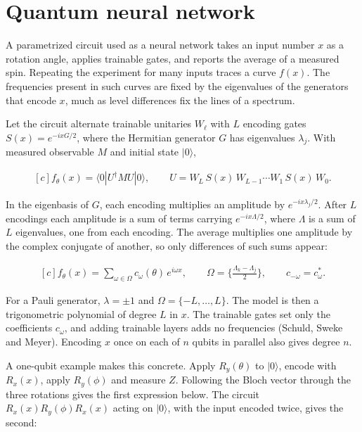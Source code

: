 \documentclass[11pt,oneside]{book}
\newenvironment{centeredalign}{\[\begin{gathered}[c]}{\end{gathered}\]}
\begin{document}
\clearpage

\section{Quantum neural network}

\label{topic:quantum-neural-network}

A parametrized circuit used as a neural network takes an input number \(x\) as a rotation angle, applies trainable gates, and reports the average of a measured spin. Repeating the experiment for many inputs traces a curve \(f(x)\). The frequencies present in such curves are fixed by the eigenvalues of the generators that encode \(x\), much as level differences fix the lines of a spectrum.

Let the circuit alternate trainable unitaries \(W_\ell\) with \(L\) encoding gates \(S(x)=e^{-ixG/2}\), where the Hermitian generator \(G\) has eigenvalues \(\lambda_j\). With measured observable \(M\) and initial state \(|0\rangle\),

\begin{centeredalign}
f_\theta(x)=\langle0|U^\dagger MU|0\rangle,\qquad
U=W_L\,S(x)\,W_{L-1}\cdots W_1\,S(x)\,W_0.
\end{centeredalign}

In the eigenbasis of \(G\), each encoding multiplies an amplitude by \(e^{-ix\lambda_j/2}\). After \(L\) encodings each amplitude is a sum of terms carrying \(e^{-ix\Lambda/2}\), where \(\Lambda\) is a sum of \(L\) eigenvalues, one from each encoding. The average multiplies one amplitude by the complex conjugate of another, so only differences of such sums appear:

\begin{centeredalign}
f_\theta(x)=\sum_{\omega\in\Omega}c_\omega(\theta)\,e^{i\omega x},\qquad
\Omega=\Big\{\frac{\Lambda_k-\Lambda_j}{2}\Big\},\qquad c_{-\omega}=c_\omega^*.
\end{centeredalign}

For a Pauli generator, \(\lambda=\pm1\) and \(\Omega=\{-L,\ldots,L\}\). The model is then a trigonometric polynomial of degree \(L\) in \(x\). The trainable gates set only the coefficients \(c_\omega\), and adding trainable layers adds no frequencies (Schuld, Sweke and Meyer). Encoding \(x\) once on each of \(n\) qubits in parallel also gives degree \(n\).

A one-qubit example makes this concrete. Apply \(R_y(\theta)\) to \(|0\rangle\), encode with \(R_x(x)\), apply \(R_y(\phi)\) and measure \(Z\). Following the Bloch vector through the three rotations gives the first expression below. The circuit \(R_x(x)R_y(\phi)R_x(x)\) acting on \(|0\rangle\), with the input encoded twice, gives the second:
\end{document}
